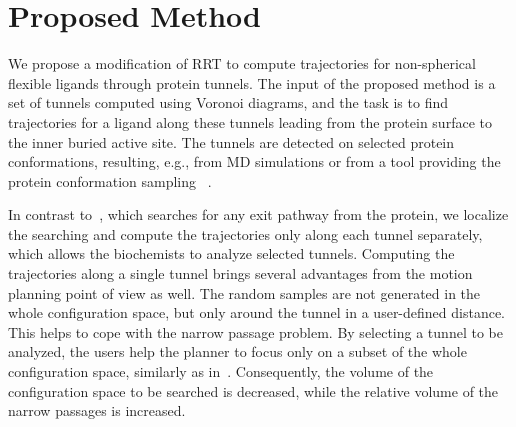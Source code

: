 \documentclass[usletter, 10pt, conference]{ieeeconf} %
\begin{document}


\section{Proposed Method}
We propose a modification of RRT to compute trajectories for non-spherical flexible ligands through protein tunnels.
The input of the proposed method is a set of tunnels computed using Voronoi diagrams, and the task is to find trajectories for a ligand along these tunnels leading from the protein surface to the inner buried active site.
The tunnels are detected on selected protein conformations, 
    resulting, e.g., from MD simulations or from a tool providing the protein conformation sampling
~\cite{lei2004sampling,wells2005constrained,seeliger2007geometry}.

In contrast to~\cite{cortes2010simulating}, which searches for any exit pathway from the protein, we localize the searching and compute the trajectories only along each tunnel separately, which allows the biochemists to analyze selected tunnels.
Computing the trajectories along a single tunnel brings several advantages from the motion planning point of view as well.
The random samples are not generated in the whole configuration space, but only around the tunnel in a user-defined distance. 
This helps to cope with the narrow passage problem.
By selecting a tunnel to be analyzed, the users help the planner to focus only on a subset of the whole configuration
space, similarly as in~\cite{denny2018general}.
Consequently, the volume of the configuration space to be searched is decreased, while the relative volume of the narrow passages is increased.
\end{document}
